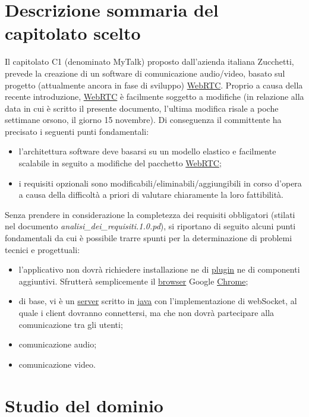 \section{Descrizione sommaria del capitolato scelto}
Il capitolato C1 (denominato MyTalk) proposto dall'azienda italiana Zucchetti, prevede la creazione di un software di comunicazione audio/video, basato sul progetto (attualmente ancora in fase di sviluppo) \underline{WebRTC}. Proprio a causa della recente introduzione, \underline{WebRTC} è facilmente soggetto a modifiche (in relazione alla data in cui è scritto il presente documento, l'ultima modifica risale a poche settimane orsono, il giorno 15 novembre). Di conseguenza il committente ha precisato i seguenti punti fondamentali:

\begin{itemize}
	\item l'architettura software deve basarsi su un modello elastico e facilmente scalabile in seguito a modifiche del pacchetto \underline{WebRTC};
	\item i requisiti opzionali sono modificabili/eliminabili/aggiungibili in corso d'opera a causa della difficoltà a priori di valutare chiaramente la loro fattibilità.
\end{itemize}

Senza prendere in considerazione la completezza dei requisiti obbligatori (stilati nel documento \textit{analisi\_dei\_requisiti.1.0.pd}), si riportano di seguito alcuni punti fondamentali da cui è possibile trarre spunti per la determinazione di problemi tecnici e progettuali:

\begin{itemize}
	\item l'applicativo non dovrà richiedere installazione ne di \underline{plugin} ne di componenti aggiuntivi. Sfrutterà semplicemente il \underline{browser} Google \underline{Chrome};
	\item di base, vi è un \underline{server} scritto in \underline{java} con l'implementazione di webSocket, al quale i client dovranno connettersi, ma che non dovrà partecipare alla comunicazione tra gli utenti;
	\item comunicazione audio;
	\item comunicazione video.
\end{itemize}

\section{Studio del dominio}

